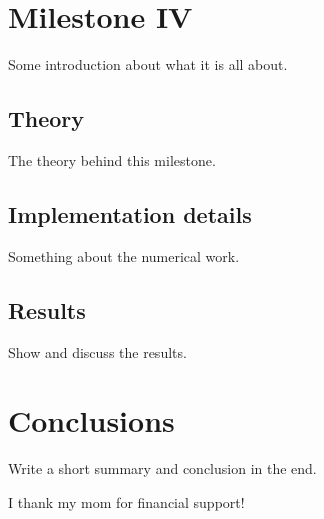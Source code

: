 \documentclass{aa}
\begin{document}
\section{Milestone IV}
Some introduction about what it is all about.

\subsection{Theory}
The theory behind this milestone.

\subsection{Implementation details}
Something about the numerical work.

\subsection{Results}
Show and discuss the results.

\section{Conclusions}

Write a short summary and conclusion in the end. 

\begin{acknowledgements}
      I thank my mom for financial support!
\end{acknowledgements}


%
\end{document}
